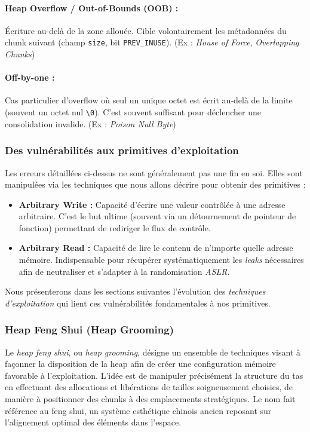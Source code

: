 \paragraph{Heap Overflow / Out-of-Bounds (OOB) :} Écriture au-delà de la zone allouée. Cible volontairement les métadonnées du chunk suivant (champ \texttt{size}, bit \texttt{PREV\_INUSE}). (Ex : \textit{House of Force}, \textit{Overlapping Chunks})

\paragraph{Off-by-one :} Cas particulier d'overflow où seul un unique octet est écrit au-delà de la limite (souvent un octet nul \verb|\0|). C'est souvent suffisant pour déclencher une consolidation invalide. (Ex : \textit{Poison Null Byte})

\subsubsection{Des vulnérabilités aux primitives d'exploitation}

Les erreurs détaillées ci-dessus ne sont généralement pas une fin en soi. Elles sont manipulées via les techniques que nous allons décrire pour obtenir des primitives :

\begin{itemize}
    \item \textbf{Arbitrary Write :} Capacité d'écrire une valeur contrôlée à une adresse arbitraire. C'est le but ultime (souvent via un détournement de pointeur de fonction) permettant de rediriger le flux de contrôle.
    \item \textbf{Arbitrary Read :} Capacité de lire le contenu de n'importe quelle adresse mémoire. Indispensable pour récupérer systématiquement les \textit{leaks} nécessaires afin de neutraliser et s'adapter à la randomisation \textit{ASLR}.
\end{itemize}

Nous présenterons dans les sections suivantes l'évolution des \textit{techniques d'exploitation} qui lient ces vulnérabilités fondamentales à nos primitives.

\subsubsection{Heap Feng Shui (Heap Grooming)}

Le \textit{heap feng shui}, ou \textit{heap grooming}, désigne un ensemble de techniques visant à façonner la disposition de la heap afin de créer une configuration mémoire favorable à l'exploitation.
L'idée est de manipuler précisément la structure du tas en effectuant des allocations et libérations de tailles soigneusement choisies, de manière à positionner des chunks à des emplacements stratégiques.
Le nom fait référence au feng shui, un système esthétique chinois ancien reposant sur l'alignement optimal des éléments dans l'espace.

